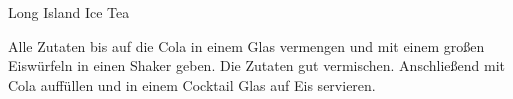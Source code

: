 \documentclass[../recipe-collections/cocktails.tex]{subfiles}
\begin{document}
\begin{recipe}{Long Island Ice Tea}{}{}

  \freeform{}\textit{}


  Alle Zutaten bis auf die Cola in einem Glas vermengen und mit einem großen Eiswürfeln in einen Shaker geben.
  Die Zutaten gut vermischen.
  Anschließend mit Cola auffüllen und in einem Cocktail Glas auf Eis servieren.

  \freeform{}\hrulefill{}

\end{recipe}
\end{document}
